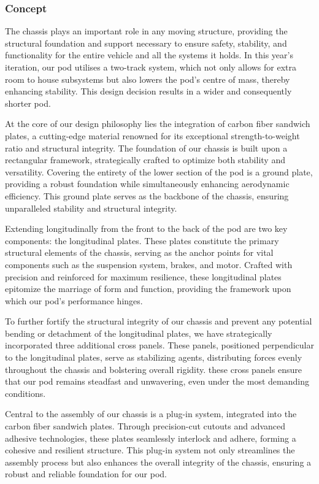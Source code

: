 \subsubsection{Concept}

The chassis plays an important role in any moving structure, providing the structural foundation and support necessary to ensure safety, stability, and functionality for the entire vehicle and all the systems it holds. 
In this year's iteration, our pod utilises a two-track system, which not only allows for extra room to house subsystems but also lowers the pod's centre of mass, thereby enhancing stability. This design decision results in a wider and consequently shorter pod.

At the core of our design philosophy lies the integration of carbon fiber sandwich plates, a cutting-edge material renowned for its exceptional strength-to-weight ratio and structural integrity.
The foundation of our chassis is built upon a rectangular framework, strategically crafted to optimize both stability and versatility. Covering the entirety of the lower section of the pod is a ground plate, providing a robust foundation while simultaneously enhancing aerodynamic efficiency. This ground plate serves as the backbone of the chassis, ensuring unparalleled stability and structural integrity.

Extending longitudinally from the front to the back of the pod are two key components: the longitudinal plates. These plates constitute the primary structural elements of the chassis, serving as the anchor points for vital components such as the suspension system, brakes, and motor. Crafted with precision and reinforced for maximum resilience, these longitudinal plates epitomize the marriage of form and function, providing the framework upon which our pod's performance hinges.

To further fortify the structural integrity of our chassis and prevent any potential bending or detachment of the longitudinal plates, we have strategically incorporated three additional cross panels. These panels, positioned perpendicular to the longitudinal plates, serve as stabilizing agents, distributing forces evenly throughout the chassis and bolstering overall rigidity. these cross panels ensure that our pod remains steadfast and unwavering, even under the most demanding conditions.

Central to the assembly of our chassis is a plug-in system, integrated into the carbon fiber sandwich plates. Through precision-cut cutouts and advanced adhesive technologies, these plates seamlessly interlock and adhere, forming a cohesive and resilient structure. This plug-in system not only streamlines the assembly process but also enhances the overall integrity of the chassis, ensuring a robust and reliable foundation for our pod.


